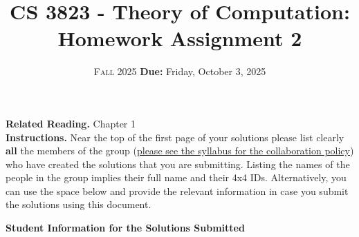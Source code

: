 \documentclass[letterpaper,11pt,twoside]{article}
\def\mytitle{CS 3823 - Theory of Computation: Homework Assignment 2}
\def\thecurrentsemester{Fall 2025}
\def\myduedate{\textbf{Due:} Friday, October 3, 2025}
\begin{document}

\author{
\textsc{\thecurrentsemester} \hspace{3cm}\myduedate
}
\title{\mytitle}
\date{}
\maketitle


\thispagestyle{firststyle}


\vspace{-0.5cm}
\noindent\makebox[\linewidth]{\rule{\columnwidth}{2pt}}

\noindent\textbf{Related Reading.} Chapter 1\\
\noindent\textbf{Instructions.} Near the top of the first page of your solutions please list clearly \textbf{all} the members of the group (\underline{please see the syllabus for the collaboration policy}) who have created the solutions that you are submitting. Listing the names of the people in the group implies their full name and their 4x4 IDs.
Alternatively, you can use the space below and provide the relevant information 
in case you submit the solutions using this document.\\ 
\noindent\makebox[\linewidth]{\rule{\columnwidth}{2pt}}


\begin{center}
\textbf{Student Information for the Solutions Submitted}
\end{center}
\end{document}
